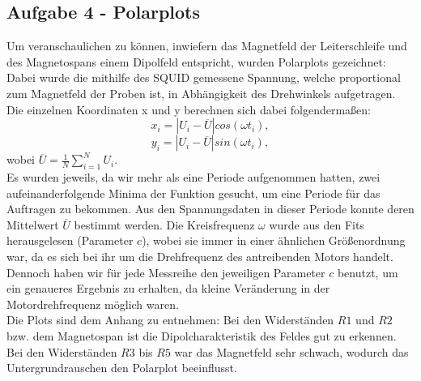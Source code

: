 \subsection{Aufgabe 4 - Polarplots}
Um veranschaulichen zu können, inwiefern das Magnetfeld der Leiterschleife und des Magnetospans einem Dipolfeld entspricht, wurden Polarplots gezeichnet: Dabei wurde die mithilfe des SQUID gemessene Spannung, welche proportional zum Magnetfeld der Proben ist, in Abhängigkeit des Drehwinkels aufgetragen. Die einzelnen Koordinaten x und y berechnen sich dabei folgendermaßen:
\[x_{i}=\left|U_{i}-\overline{U}\right|cos(\omega t_{i}),\]
\[y_{i}=\left|U_{i}-\overline{U}\right|sin(\omega t_{i}),\]
wobei $\overline{U}=\frac{1}{N}\sum_{i=1}^{N}U_{i}$.\\
Es wurden jeweils, da wir mehr als eine Periode aufgenommen hatten, zwei aufeinanderfolgende Minima der Funktion gesucht, um eine Periode für das Auftragen zu bekommen. Aus den Spannungsdaten in dieser Periode konnte deren Mittelwert $\overline{U}$ bestimmt werden. Die Kreisfrequenz $\omega$ wurde aus den Fits herausgelesen (Parameter $c$), wobei sie immer in einer ähnlichen Größenordnung war, da es sich bei ihr um die Drehfrequenz des antreibenden Motors handelt. Dennoch haben wir für jede Messreihe den jeweiligen Parameter $c$ benutzt, um ein genaueres Ergebnis zu erhalten, da kleine Veränderung in der Motordrehfrequenz möglich waren. \\
Die Plots sind dem Anhang zu entnehmen: Bei den Widerständen $R1$ und $R2$ bzw. dem Magnetospan ist die Dipolcharakteristik des Feldes gut zu erkennen. Bei den Widerständen $R3$ bis $R5$ war das Magnetfeld sehr schwach, wodurch das Untergrundrauschen den Polarplot beeinflusst.
